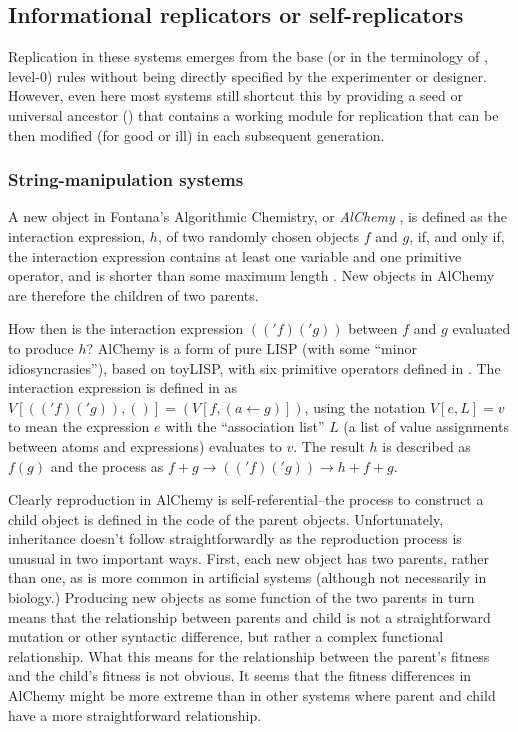 \subsection{Informational replicators or self-replicators}
Replication in these systems emerges from the base (or in the terminology of \textcite{BanzhafBaumgaertnerBeslonEtAl2016}, level-0) rules without being directly specified by the experimenter or designer. However, even here most systems still shortcut this by providing a seed or universal ancestor (\eg \textcite{Ofria2004}) that contains a working module for replication that can be then modified (for good or ill) in each subsequent generation.

\subsubsection{String-manipulation systems}

A new object in Fontana's Algorithmic Chemistry, or \emph{AlChemy} \parencite{Fontana1992}, is defined as the interaction expression, $h$, of two randomly chosen objects $f$ and $g$, if, and only if, the interaction expression contains at least one variable and one primitive operator, and is shorter than some maximum length \parencite[p.173--p.180]{Fontana1992}. New objects in AlChemy are therefore the children of two parents.

How then is the interaction expression $(('f)('g))$ between $f$ and $g$ evaluated to produce $h$? AlChemy is a form of pure LISP (with some ``minor idiosyncrasies''), based on toyLISP, with six primitive operators defined in \textcite[p.205]{Fontana1992}. The interaction expression is defined in \textcite[Definition A.9, p.204]{Fontana1992} as $V[(('f)('g)),()] = (V[f,(a\leftarrow g)])$, using the notation $V[e,L]=v$ to mean the expression $e$ with the ``association list'' $L$ (a list of value assignments between atoms and expressions) evaluates to $v$. The result $h$ is described as $f(g)$ and the process as $f+g \rightarrow (('f)('g)) \rightarrow h + f + g$.

Clearly reproduction in AlChemy is self-referential--the process to construct a child object is defined in the code of the parent objects. Unfortunately, inheritance doesn't follow straightforwardly as the reproduction process is unusual in two important ways. First, each new object has two parents, rather than one, as is more common in artificial systems (although not necessarily in biology.) Producing new objects as some function of the two parents in turn means that the relationship between parents and child is not a straightforward mutation or other syntactic difference, but rather a complex functional relationship. What this means for the relationship between the parent's fitness and the child's fitness is not obvious. It seems that the fitness differences in AlChemy might be more extreme than in other systems where parent and child have a more straightforward relationship.

